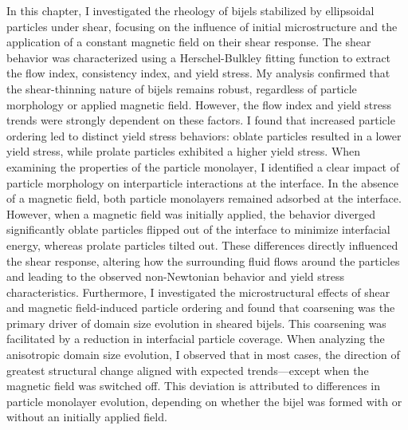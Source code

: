 In this chapter, I investigated the rheology of bijels stabilized by ellipsoidal particles under shear, focusing on the influence of initial microstructure and the 
application of a constant magnetic field on their shear response. The shear behavior was characterized using a Herschel-Bulkley fitting function to extract the flow index, 
consistency index, and yield stress. My analysis confirmed that the shear-thinning nature of bijels remains robust, regardless of particle morphology or applied magnetic 
field. However, the flow index and yield stress trends were strongly dependent on these factors.  
I found that increased particle ordering led to distinct yield stress behaviors: oblate particles resulted in a lower yield stress, while prolate particles exhibited a 
higher yield stress. When examining the properties of the particle monolayer, I identified a clear impact of particle morphology on interparticle interactions at the 
interface. In the absence of a magnetic field, both particle monolayers remained adsorbed at the interface. However, when a magnetic field was initially applied, the 
behavior diverged significantly oblate particles flipped out of the interface to minimize interfacial energy, whereas prolate particles tilted out. These differences 
directly influenced the shear response, altering how the surrounding fluid flows around the particles and leading to the observed non-Newtonian behavior and yield 
stress characteristics.  
Furthermore, I investigated the microstructural effects of shear and magnetic field-induced particle ordering and found that coarsening was the primary driver of 
domain size evolution in sheared bijels. This coarsening was facilitated by a reduction in interfacial particle coverage. When analyzing the anisotropic domain size evolution, 
I observed that in most cases, the direction of greatest structural change aligned with expected trends—except when the magnetic field was switched off. This deviation is 
attributed to differences in particle monolayer evolution, depending on whether the bijel was formed with or without an initially applied field.  



